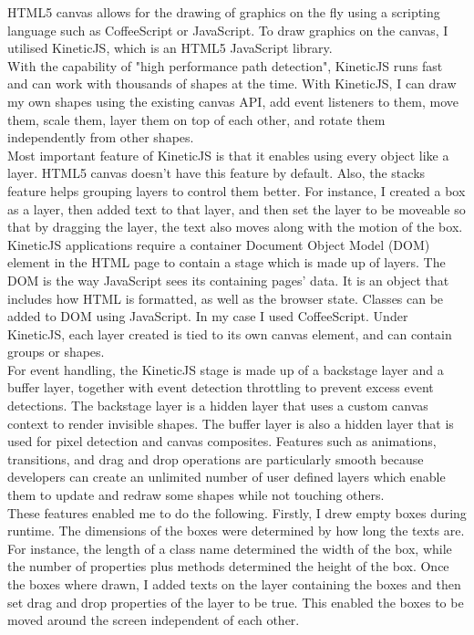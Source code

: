 \documentclass[a4paper,12pt]{article}
\begin{document}
\indent HTML5 canvas allows for the drawing of graphics on the fly using a scripting language such as CoffeeScript or JavaScript. To draw graphics on the canvas, I utilised KineticJS, which is an HTML5 JavaScript library.\\

\indent With the capability of "high performance path detection", KineticJS runs fast and can work with thousands of shapes at the time. With KineticJS, I can draw my own shapes using the existing canvas API, add event listeners to them, move them, scale them, layer them on top of each other, and rotate them independently from other shapes. \\

\indent Most important feature of KineticJS is that it enables using every object like a layer. HTML5 canvas doesn’t have this feature by default. Also, the stacks feature helps grouping layers to control them better. For instance, I created a box as a layer, then added text to that layer, and then set the layer to be moveable so that by dragging the layer, the text also moves along with the motion of the box.
KineticJS applications require a container Document Object Model (DOM) element in the HTML page to contain a stage which is made up of layers. The DOM is the way JavaScript sees its containing pages’ data. It is an object that includes how HTML is formatted, as well as the browser state. Classes can be added to DOM using JavaScript. In my case I used CoffeeScript. Under KineticJS, each layer created is tied to its own canvas element, and can contain groups or shapes.\\

\indent For event handling, the KineticJS stage is made up of a backstage layer and a buffer layer, together with event detection throttling to prevent excess event detections. The backstage layer is a hidden layer that uses a custom canvas context to render invisible shapes. The buffer layer is also a hidden layer that is used for pixel detection and canvas composites. Features such as animations, transitions, and drag and drop operations are particularly smooth because developers can create an unlimited number of user defined layers which enable them to update and redraw some shapes while not touching others.\\

\indent These features enabled me to do the following. Firstly, I drew empty boxes during runtime. The dimensions of the boxes were determined by how long the texts are. For instance, the length of a class name determined the width of the box, while the number of properties plus methods determined the height of the box. Once the boxes where drawn, I added texts on the layer containing the boxes and then set drag and drop properties of the layer to be true. This enabled the boxes to be moved around the screen independent of each other.
\end{document}
